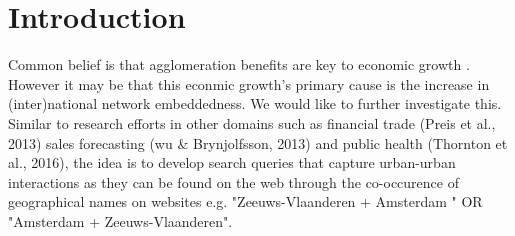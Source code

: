 \section{Introduction}

Common belief is that agglomeration benefits are key to economic growth \cite{porter2000location}. 
However it may be that this econmic growth's primary cause is the increase in (inter)national network embeddedness. 
We would like to further investigate this.
Similar to research efforts in other domains such as financial trade (Preis et al., 2013) sales forecasting (wu \& Brynjolfsson, 2013) and public health (Thornton et al., 2016), the idea is to develop search queries that capture urban-urban interactions as they can be found on the web through the co-occurence of geographical names on websites e.g. "Zeeuws-Vlaanderen + Amsterdam " OR "Amsterdam + Zeeuws-Vlaanderen". \\
